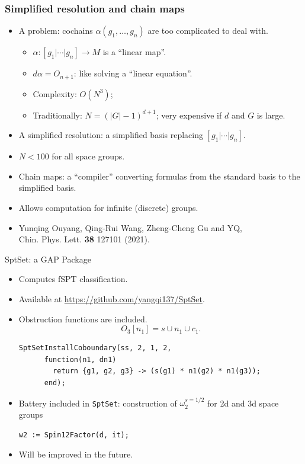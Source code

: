 \documentclass[xcolor=table, 11pt, aspectratio=169]{beamer}
\begin{document}
\begin{frame}
  \frametitle{Simplified resolution and chain maps}
  \begin{itemize}
  \item A problem: cochains $\alpha(g_1,\ldots,g_n)$ are too complicated to deal with.
    \begin{itemize}
    \item $\alpha: [g_1|\cdots|g_n]\rightarrow M$ is a ``linear map''.
    \item $d\alpha = O_{n+1}$: like solving a ``linear equation''. 
    \item Complexity: $O(N^3)$;
    \item Traditionally: $N=(|G|-1)^{d+1}$; very expensive if $d$ and $G$ is large.
    \end{itemize}
  \item A simplified resolution: a simplified basis replacing $[g_1|\cdots|g_n]$.
  \item $N<100$ for all space groups.
  \item Chain maps: a ``compiler'' converting formulas from the standard basis to the simplified basis.
  \item Allows computation for infinite (discrete) groups.
  \item Yunqing Ouyang, Qing-Rui Wang, Zheng-Cheng Gu and YQ,\\ Chin. Phys. Lett. \textbf{38} 127101 (2021).
  \end{itemize}
\end{frame}

\begin{frame}[fragile]{SptSet: a GAP Package}
	\begin{itemize}
		\item Computes fSPT classification.
		\item Available at \url{https://github.com/yangqi137/SptSet}.
		\item Obstruction functions are included.
    \[O_3[n_1]=s\cup n_1\cup c_1.\]
    \begin{lstlisting}[basicstyle=\footnotesize]
      SptSetInstallCoboundary(ss, 2, 1, 2,
      function(n1, dn1)
        return {g1, g2, g3} -> (s(g1) * n1(g2) * n1(g3));
      end);
      \end{lstlisting}
		\item Battery included in \lstinline|SptSet|: construction of $\omega_2^{s=1/2}$ for 2d and 3d space groups
    \begin{lstlisting}[basicstyle=\footnotesize]
    w2 := Spin12Factor(d, it);
    \end{lstlisting}
		\item Will be improved in the future.
	\end{itemize}
\end{frame}
\end{document}
